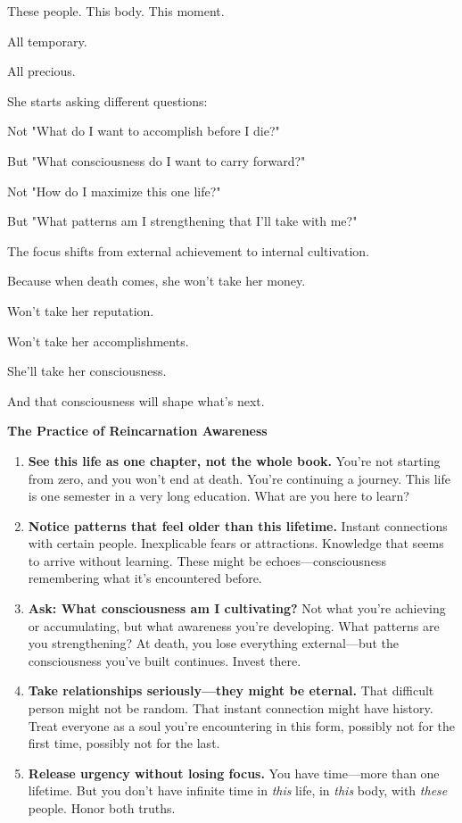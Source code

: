 \documentclass[11pt,twoside]{book}
\begin{document}
These people. This body. This moment.

All temporary.

All precious.

She starts asking different questions:

Not "What do I want to accomplish before I die?"

But "What consciousness do I want to carry forward?"

Not "How do I maximize this one life?"

But "What patterns am I strengthening that I'll take with me?"

The focus shifts from external achievement to internal cultivation.

Because when death comes, she won't take her money.

Won't take her reputation.

Won't take her accomplishments.

She'll take her consciousness.

And that consciousness will shape what's next.

\begin{practicebox}
\textbf{The Practice of Reincarnation Awareness}

\begin{enumerate}
\item \textbf{See this life as one chapter, not the whole book.} You're not starting from zero, and you won't end at death. You're continuing a journey. This life is one semester in a very long education. What are you here to learn?

\item \textbf{Notice patterns that feel older than this lifetime.} Instant connections with certain people. Inexplicable fears or attractions. Knowledge that seems to arrive without learning. These might be echoes—consciousness remembering what it's encountered before.

\item \textbf{Ask: What consciousness am I cultivating?} Not what you're achieving or accumulating, but what awareness you're developing. What patterns are you strengthening? At death, you lose everything external—but the consciousness you've built continues. Invest there.

\item \textbf{Take relationships seriously—they might be eternal.} That difficult person might not be random. That instant connection might have history. Treat everyone as a soul you're encountering in this form, possibly not for the first time, possibly not for the last.

\item \textbf{Release urgency without losing focus.} You have time—more than one lifetime. But you don't have infinite time in \textit{this} life, in \textit{this} body, with \textit{these} people. Honor both truths.
\end{enumerate}
\end{practicebox}
\end{document}
